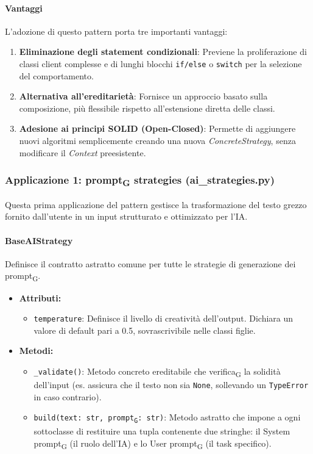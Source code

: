 \documentclass[11pt,a4paper]{article}
\newcommand{\gls}[1]{#1\textsubscript{G}}
\begin{document}
\paragraph{Vantaggi}
L'adozione di questo pattern porta tre importanti vantaggi:
\begin{enumerate}
    \item \textbf{Eliminazione degli statement condizionali}: Previene la proliferazione di classi client complesse e di lunghi blocchi \texttt{if/else} o \texttt{switch} per la selezione del comportamento.
    \item \textbf{Alternativa all'ereditarietà}: Fornisce un approccio basato sulla composizione, più flessibile rispetto all'estensione diretta delle classi.
    \item \textbf{Adesione ai principi SOLID (Open-Closed)}: Permette di aggiungere nuovi algoritmi semplicemente creando una nuova \textit{ConcreteStrategy}, senza modificare il \textit{Context} preesistente.
\end{enumerate}

\subsubsection{Applicazione 1: \gls{prompt} strategies (ai\_strategies.py)}
Questa prima applicazione del pattern gestisce la trasformazione del testo grezzo fornito dall'utente in un input strutturato e ottimizzato per l'IA.

\paragraph{BaseAIStrategy}
Definisce il contratto astratto comune per tutte le strategie di generazione dei \gls{prompt}.
\begin{itemize}
    \item\textbf{Attributi:}
\begin{itemize}
    \item \texttt{temperature}: Definisce il livello di creatività dell'output. Dichiara un valore di default pari a 0.5, sovrascrivibile nelle classi figlie.
\end{itemize}
    \item \textbf{Metodi:}
\begin{itemize}
    \item \texttt{\_validate()}: Metodo concreto ereditabile che \gls{verifica} la solidità dell'input (es. assicura che il testo non sia \texttt{None}, sollevando un \texttt{TypeError} in caso contrario).
    \item \texttt{build(text: str, \gls{prompt}: str)}: Metodo astratto che impone a ogni sottoclasse di restituire una tupla contenente due stringhe: il \gls{System prompt} (il ruolo dell'IA) e lo \gls{User prompt} (il task specifico).
\end{itemize}
\end{itemize}
\end{document}
